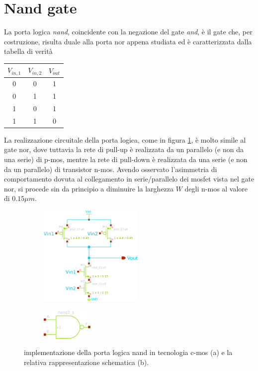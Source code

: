 \section{Nand gate}
	La porta logica \textit{nand}, coincidente con la negazione del gate \textit{and}, è il gate che, per costruzione, risulta duale alla porta nor appena studiata ed è caratterizzata dalla tabella di verità
	\begin{center}
		\begin{tabular}{c c | c}
			$V_{in,1}$ & $V_{in,2}$ & $V_{out}$ \\ \hline
			0 & 0 & 1 \\
			0 & 1 & 1 \\
			1 & 0 & 1 \\
			1 & 1 & 0 \\
		\end{tabular}
	\end{center}
	
	La realizzazione circuitale della porta logica, come in figura \ref{fig:nand:schematico}, è molto simile al gate nor, dove tuttavia la rete di pull-up è realizzata da un parallelo (e non da una serie) di p-mos, mentre la rete di pull-down è realizzata da una serie (e non da un parallelo) di transistor n-mos. Avendo osservato l'asimmetria di comportamento dovuta al collegamento in serie/parallelo dei mosfet vista nel gate nor, si procede sin da principio a diminuire la larghezza $W$ degli n-mos al valore di $0.15 \mu m$.

	\begin{figure}[bht]
		\centering
		\begin{subfigure}{0.48\linewidth}
			\centering
			\includegraphics[width=5cm]{Immagini/nand-gate.eps} \caption{}			
		\end{subfigure}
		\begin{subfigure}{0.48\linewidth}
			\centering
			\includegraphics[width=2.5cm]{Immagini/nand-gate-simple.eps} \caption{}			
		\end{subfigure}
		\caption{implementazione della porta logica nand in tecnologia c-mos (a) e la relativa rappresentazione schematica (b).}
		\label{fig:nand:schematico}
	\end{figure}

